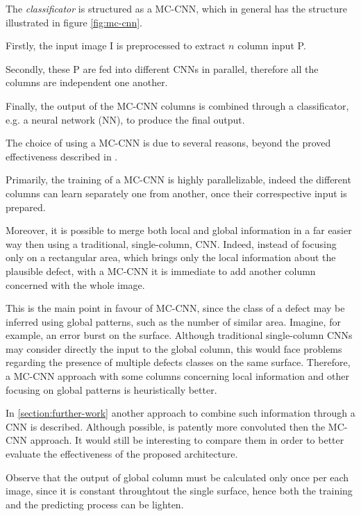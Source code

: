     \par{
        The \emph{classificator} is structured as a MC-CNN, which in general has the structure illustrated in figure \ref{fig:mc-cnn}. 
    }
    \par{
        Firstly, the input image I is preprocessed to extract $n$ column input P.
    }
    \par{
        Secondly, these P are fed into different CNNs in parallel, therefore all the columns are independent one another. 
    }
    \par{
        Finally, the output of the MC-CNN columns is combined through a classificator, e.g. a neural network (NN), to produce the final output.
    }
    \par{
        The choice of using a MC-CNN is due to several reasons, beyond the proved effectiveness described in \cite{ieee:6248110}.
    }
    \par{
        Primarily, the training of a MC-CNN is highly parallelizable, indeed the different columns can learn separately one from another, once their correspective input is prepared.
    }
    \par{
        Moreover, it is possible to merge both local and global information in a far easier way then using a traditional, single-column, CNN. Indeed, instead of focusing only on a rectangular area, which brings only the local information about the plausible defect, with a MC-CNN it is immediate to add another column concerned with the whole image.
    }
    \par{
        This is the main point in favour of MC-CNN, since the class of a defect may be inferred using global patterns, such as the number of similar area. Imagine, for example, an error burst on the surface. Although traditional single-column CNNs may consider directly the input to the global column, this would face problems regarding the presence of multiple defects classes on the same surface. Therefore, a MC-CNN approach with some columns concerning local information and other focusing on global patterns is heuristically better.
    }
    \par{
        In \ref{section:further-work} another approach to combine such information through a CNN is described. Although possible, is patently more convoluted then the MC-CNN approach. It would still be interesting to compare them in order to better evaluate the effectiveness of the proposed architecture. 
    }
    \par{
        Observe that the output of global column must be calculated only once per each image, since it is constant throughtout the single surface, hence both the training and the predicting process can be lighten.
    }
